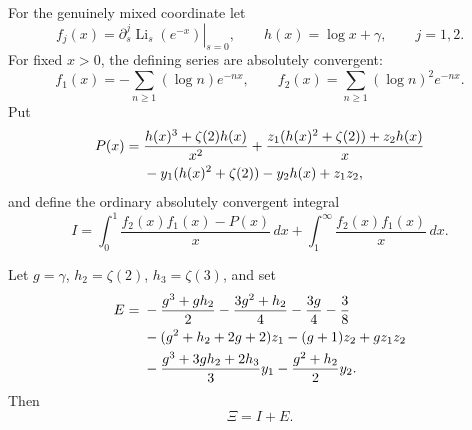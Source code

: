 For the genuinely mixed coordinate let
\[
 f_j(x)=\left.\partial_s^j\operatorname{Li}_s(e^{-x})\right|_{s=0},
 \qquad h(x)=\log x+\gamma,\qquad j=1,2.
\]
For fixed \(x>0\), the defining series are absolutely convergent:
\[
 f_1(x)=-\sum_{n\ge1}(\log n)e^{-nx},\qquad
 f_2(x)=\sum_{n\ge1}(\log n)^2e^{-nx}.
\]
Put
\begin{align}
 P(x)={}&\frac{h(x)^3+\zeta(2)h(x)}{x^2}
 +\frac{z_1(h(x)^2+\zeta(2))+z_2h(x)}{x}\notag\\
 &-y_1(h(x)^2+\zeta(2))-y_2h(x)+z_1z_2,
 \label{qtr:P}
\end{align}
and define the ordinary absolutely convergent integral
\begin{equation}\label{qtr:I}
 I=\int_0^1\frac{f_2(x)f_1(x)-P(x)}{x}\,dx
                  +\int_1^\infty\frac{f_2(x)f_1(x)}{x}\,dx.
\end{equation}

\begin{proposition}
\label{qtr:Xiprop}
Let \(g=\gamma\), \(h_2=\zeta(2)\), \(h_3=\zeta(3)\), and set
\begin{align}
 E={}&-\frac{g^3+gh_2}{2}
       -\frac{3g^2+h_2}{4}-\frac{3g}{4}-\frac38\notag\\
 &-(g^2+h_2+2g+2)z_1-(g+1)z_2+gz_1z_2\notag\\
 &-\frac{g^3+3gh_2+2h_3}{3}y_1
       -\frac{g^2+h_2}{2}y_2.
 \label{qtr:E}
\end{align}
Then
\begin{equation}\label{qtr:Xi}
 \Xi=I+E.
\end{equation}
\end{proposition}

